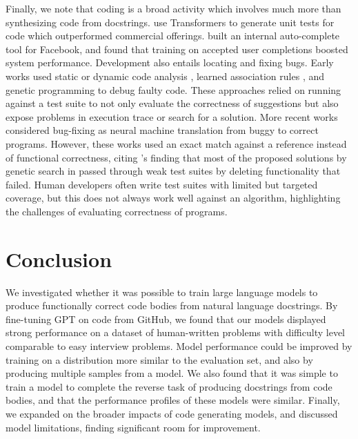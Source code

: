 Finally, we note that coding is a broad activity which involves much more than synthesizing code from docstrings. \citet{tufano2020utcgen} use Transformers to generate unit tests for code which outperformed commercial offerings. \citet{aye2021autocompletion} built an internal auto-complete tool for Facebook, and found that training on accepted user completions boosted system performance. Development also entails locating and fixing bugs. Early works used static or dynamic code analysis \citep{agrawal1995fault,korel1997dynamic}, learned association rules \citep{jeffrey2009bugfix}, and genetic programming \citep{goues2012genetic} to debug faulty code. These approaches relied on running against a test suite to not only evaluate the correctness of suggestions but also expose problems in execution trace or search for a solution. More recent works \citep{tufano2019bugfixing,drain2021bugfixing} considered bug-fixing as neural machine translation from buggy to correct programs. However, these works used an exact match against a reference instead of functional correctness, citing \citet{qi2015correctness}'s finding that most of the proposed solutions by genetic search in \citep{goues2012genetic} passed through weak test suites by deleting functionality that failed. Human developers often write test suites with limited but targeted coverage, but this does not always work well against an algorithm, highlighting the challenges of evaluating correctness of programs.

\section{Conclusion}
\label{sec:conc}

We investigated whether it was possible to train large language models to produce functionally correct code bodies from natural language docstrings. By fine-tuning GPT on code from GitHub, we found that our models displayed strong performance on a dataset of human-written problems with difficulty level comparable to easy interview problems. Model performance could be improved by training on a distribution more similar to the evaluation set, and also by producing multiple samples from a model. We also found that it was simple to train a model to complete the reverse task of producing docstrings from code bodies, and that the performance profiles of these models were similar. Finally, we expanded on the broader impacts of code generating models, and discussed model limitations, finding significant room for improvement.


